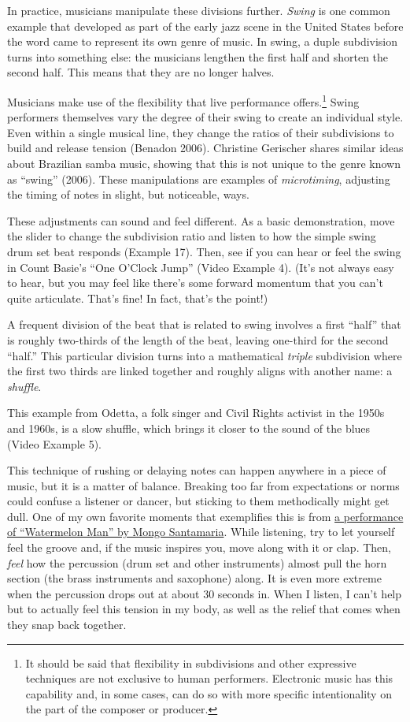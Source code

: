 \documentclass[twoside]{article}
\begin{document}
In practice, musicians manipulate these divisions further. \emph{Swing}
is one common example that developed as part of the early jazz scene in
the United States before the word came to represent its own genre of
music. In swing, a duple subdivision turns into something else: the
musicians lengthen the first half and shorten the second half. This
means that they are no longer halves.

Musicians make use of the flexibility that live performance
offers.\footnote{It should be said that flexibility in subdivisions and
  other expressive techniques are not exclusive to human performers.
  Electronic music has this capability and, in some cases, can do so
  with more specific intentionality on the part of the composer or
  producer.} Swing performers themselves vary the degree of their swing
to create an individual style. Even within a single musical line, they
change the ratios of their subdivisions to build and release tension
(Benadon 2006). Christine Gerischer shares similar ideas about Brazilian
samba music, showing that this is not unique to the genre known as
``swing'' (2006). These manipulations are examples of
\emph{microtiming}, adjusting the timing of notes in slight, but
noticeable, ways.

These adjustments can sound and feel different. As a basic
demonstration, move the slider to change the subdivision ratio and
listen to how the simple swing drum set beat responds (Example 17). Then, see if you
can hear or feel the swing in Count Basie's ``One O'Clock Jump'' (Video Example 4). (It's
not always easy to hear, but you may feel like there's some forward
momentum that you can't quite articulate. That's fine! In fact, that's
the point!)

A frequent division of the beat that is related to swing involves a
first ``half'' that is roughly two-thirds of the length of the beat,
leaving one-third for the second ``half.'' This particular division
turns into a mathematical \emph{triple} subdivision where the first two
thirds are linked together and roughly aligns with another name: a
\emph{shuffle}.

This example from Odetta, a folk singer and Civil Rights activist in the
1950s and 1960s, is a slow shuffle, which brings it closer to the sound
of the blues (Video Example 5).

This technique of rushing or delaying notes can happen anywhere in a
piece of music, but it is a matter of balance. Breaking too far from
expectations or norms could confuse a listener or dancer, but sticking
to them methodically might get dull. One of my own favorite moments that
exemplifies this is from
\href{https://www.youtube.com/embed/zJuX-JJ8WF0}{a performance of
``Watermelon Man'' by Mongo Santamaria}. While listening, try to let
yourself feel the groove and, if the music inspires you, move along with
it or clap. Then, \emph{feel} how the percussion (drum set and other
instruments) almost pull the horn section (the brass instruments and
saxophone) along. It is even more extreme when the percussion drops out
at about 30 seconds in. When I listen, I can't help but to actually feel
this tension in my body, as well as the relief that comes when they snap
back together.
\end{document}
